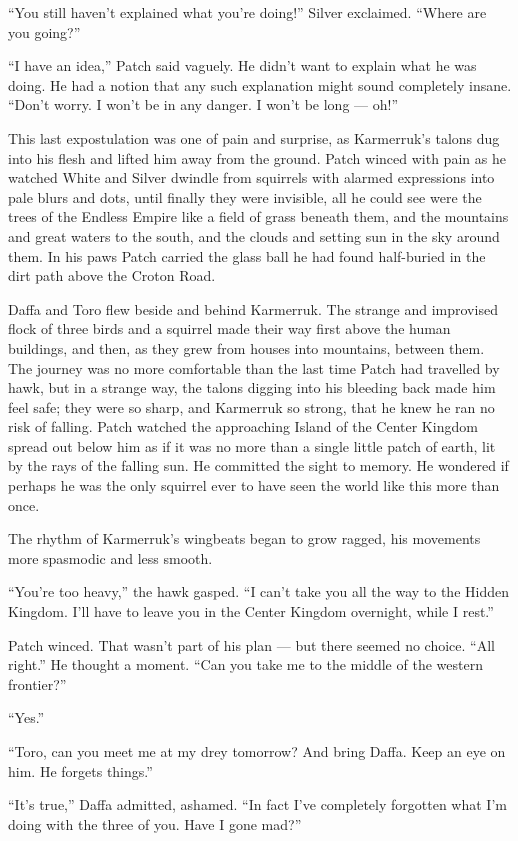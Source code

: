 \documentclass[12pt]{memoir}
\begin{document}
“You still haven’t explained what you’re doing!” Silver
exclaimed. “Where are you going?”

“I have an idea,” Patch said vaguely. He didn’t want to explain what
he was doing. He had a notion that any such explanation might sound
completely insane. “Don’t worry. I won’t be in any danger. I won’t be
long — oh!”

This last expostulation was one of pain and surprise, as Karmerruk’s
talons dug into his flesh and lifted him away from the ground. Patch
winced with pain as he watched White and Silver dwindle from squirrels
with alarmed expressions into pale blurs and dots, until finally they
were invisible, all he could see were the trees of the Endless Empire
like a field of grass beneath them, and the mountains and great waters
to the south, and the clouds and setting sun in the sky around
them. In his paws Patch carried the glass ball he had found
half-buried in the dirt path above the Croton Road.

Daffa and Toro flew beside and behind Karmerruk. The strange and
improvised flock of three birds and a squirrel made their way first
above the human buildings, and then, as they grew from houses into
mountains, between them. The journey was no more comfortable than the
last time Patch had travelled by hawk, but in a strange way, the
talons digging into his bleeding back made him feel safe; they were so
sharp, and Karmerruk so strong, that he knew he ran no risk of
falling. Patch watched the approaching Island of the Center Kingdom
spread out below him as if it was no more than a single little patch
of earth, lit by the rays of the falling sun. He committed the sight
to memory. He wondered if perhaps he was the only squirrel ever to
have seen the world like this more than once.

The rhythm of Karmerruk’s wingbeats began to grow ragged, his
movements more spasmodic and less smooth.

“You’re too heavy,” the hawk gasped. “I can’t take you all the way to
the Hidden Kingdom. I’ll have to leave you in the Center Kingdom
overnight, while I rest.”

Patch winced. That wasn’t part of his plan — but there seemed no
choice. “All right.” He thought a moment. “Can you take me to the
middle of the western frontier?”

“Yes.”

“Toro, can you meet me at my drey tomorrow? And bring Daffa. Keep an
eye on him. He forgets things.”

“It’s true,” Daffa admitted, ashamed. “In fact I’ve completely
forgotten what I’m doing with the three of you. Have I gone mad?”
\end{document}
